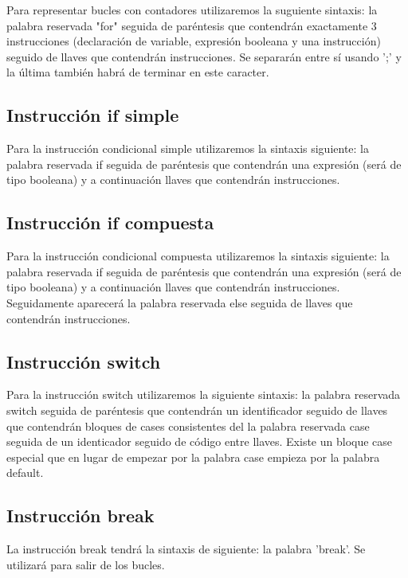 \documentclass{article}
\begin{document}
Para representar bucles con contadores utilizaremos la suguiente sintaxis: la palabra reservada "for" seguida de paréntesis que contendrán exactamente 3 instrucciones (declaración de variable, expresión booleana y una instrucción) seguido de llaves que contendrán instrucciones. Se separarán entre sí usando ';' y la última también habrá de terminar en este caracter.

\subsection{Instrucción if simple}

Para la instrucción condicional simple utilizaremos la sintaxis siguiente: la palabra reservada if seguida de paréntesis que contendrán una expresión (será de tipo booleana) y a continuación llaves que contendrán instrucciones.

\subsection{Instrucción if compuesta}

Para la instrucción condicional compuesta utilizaremos la sintaxis siguiente: la palabra reservada if seguida de paréntesis que contendrán una expresión (será de tipo booleana) y a continuación llaves que contendrán instrucciones. Seguidamente aparecerá la palabra reservada else seguida de llaves que contendrán instrucciones.

\subsection{Instrucción switch\footnotemark[1]}

Para la instrucción switch utilizaremos la siguiente sintaxis: la palabra reservada switch seguida de paréntesis que contendrán un identificador seguido de llaves que contendrán bloques de cases consistentes del la palabra reservada case seguida de un identicador seguido de código entre llaves. Existe un bloque case especial que en lugar de empezar por la palabra case empieza por la palabra default.

\subsection{Instrucción break}

La instrucción break tendrá la sintaxis de siguiente: la palabra 'break'. Se utilizará para salir de los bucles.
\end{document}

